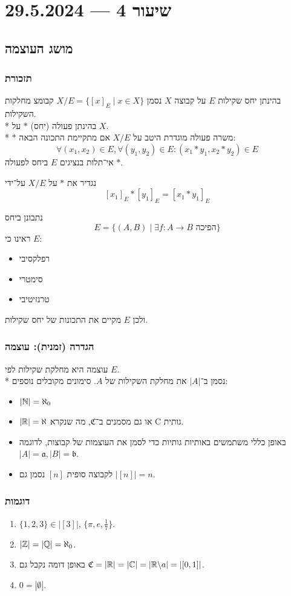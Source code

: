 \section{שיעור 4 --- 29.5.2024}
\subsection{מושג העוצמה}
\subsubsection{תזכורת}
בהינתן יחס שקילות $E$ על קבוצה $X$ נסמן $X/E = \{ {[x]}_E \mid x \in X\}$ קבומצ מחלקות השקילות. \\*
בהינתן פעולה (יחס) $*$ על $X$. \\*
$*$ משרה פעולה מוגדרת היטב על $X/E$ אם מתקיימת התכונה הבאה:
\[
	\forall (x_1, x_2) \in E, \forall (y_1, y_2) \in E : (x_1 * y_1, x_2 * y_2) \in E
\]
אי־תלות בנציגים $E$ ביחס לפעולה $*$.

נגדיר את $*$ על $X/E$ על־ידי
\[
	{[x_1]}_E * {[y_1]}_E = {[x_1 * y_1]}_E
\]

נתבונן ביחס
\[
	E = \{ (A, B) \mid \exists f : A \to B \text{ הפיכה} \}
\]
ראינו כי $E$:

\begin{itemize}
	\item רפלקסיבי
	\item סימטרי
	\item טרנזיטיבי
\end{itemize}
ולכן $E$ מקיים את התכונות של יחס שקילות.

\subsubsection{הגדרה (זמנית): עוצמה}
עוצמה היא מחלקת שקילות לפי $E$. \\*
נסמן ב־$|A|$ את מחלקת השקילות של $A$.
סימונים מקובלים נוספים:
\begin{itemize}
	\item $|\mathbb{N}| = \aleph_0$
	\item $|\mathbb{R}| = \aleph$ או גם מסמנים ב־$\mathfrak{C}$, מה שנקרא C גותית.
	\item באופן כללי משתמשים באותיות גותיות כדי לסמן את העוצמות של קבוצות, לדוגמה $|A| = \mathfrak{a}, |B| = \mathfrak{b}$.
	\item לקבוצה סופית $[n]$ נסמן גם $|[n]| = n$.
\end{itemize}

\subsubsection{דוגמות}
\begin{enumerate}
	\item $\{1, 2, 3\} \in |[3]|$, $\{\pi, e, \frac{1}{7}\}$.
	\item $|\mathbb{Z}| = |\mathbb{Q}| = \aleph_0$.
	\item באופן דומה נקבל גם $\mathfrak{C} = |\mathbb{R}| = |\mathbb{C}| = |\mathbb{R}\backslash a| = |[0, 1]|$.
	\item $0 = |\emptyset|$.
\end{enumerate}

